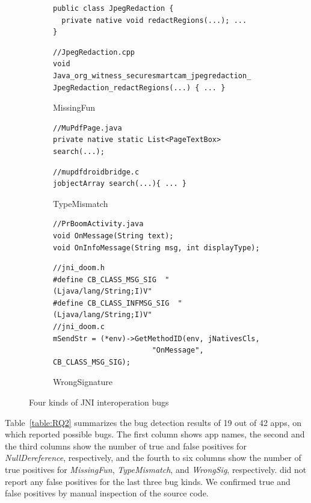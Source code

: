 \begin{figure}[t]
\begin{subfigure}[t]{0.5\textwidth}
\begin{lstlisting}[style=java,xleftmargin=2.5em]
public class JpegRedaction {
  private native void redactRegions(...); ...
}
    \end{lstlisting}
    \begin{lstlisting}[style=cpp,xleftmargin=2.5em]
//JpegRedaction.cpp
void Java_org_witness_securesmartcam_jpegredaction_ JpegRedaction_redactRegions(...) { ... }
    \end{lstlisting}
    \vspace*{-.5em}
    \caption{MissingFun}
    \label{fig:bug2}
  \end{subfigure}
  \begin{subfigure}[t]{0.5\textwidth}
    \begin{lstlisting}[style=java,xleftmargin=2.5em]
//MuPdfPage.java
private native static List<PageTextBox> search(...);
    \end{lstlisting}
    \begin{lstlisting}[style=cpp,xleftmargin=2.5em]
//mupdfdroidbridge.c
jobjectArray search(...){ ... }
    \end{lstlisting}
    \vspace*{-.5em}
    \caption{TypeMismatch}
    \label{fig:bug3}
  \end{subfigure}
  \begin{subfigure}[t]{0.5\textwidth}
    \begin{lstlisting}[style=java,xleftmargin=2.5em]
//PrBoomActivity.java
void OnMessage(String text);
void OnInfoMessage(String msg, int displayType);
    \end{lstlisting}
    \begin{lstlisting}[style=cpp,xleftmargin=2.5em]
//jni_doom.h
#define CB_CLASS_MSG_SIG  "(Ljava/lang/String;I)V"
#define CB_CLASS_INFMSG_SIG  "(Ljava/lang/String;I)V"
//jni_doom.c
mSendStr = (*env)->GetMethodID(env, jNativesCls,
                       "OnMessage", CB_CLASS_MSG_SIG);
    \end{lstlisting}
    \vspace*{-.5em}
    \caption{WrongSignature}
    \label{fig:bug3}
  \end{subfigure}
  \vspace*{-.5em}
  \caption{Four kinds of JNI interoperation bugs}
  \label{fig:bugs}
  \vspace*{-1em}
\end{figure}

Table~\ref{table:RQ2} summarizes the bug detection results of 19 out of 42
apps, on which \ours reported possible bugs.  The first
column shows app names, the second and the third columns show the
number of true and false positives for {\it NullDereference}, respectively, and
the fourth to six columns show the number of true positives for {\it
MissingFun}, {\it TypeMismatch}, and {\it WrongSig}, respectively.
\ours did not report any false positives for the last three bug kinds.
We confirmed true and false positives by manual inspection of the source code. 

